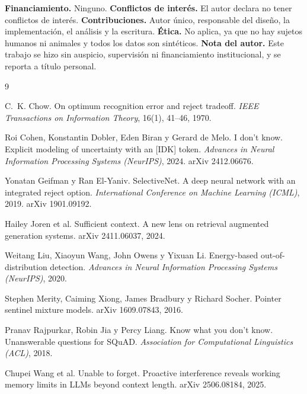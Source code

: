 \documentclass[11pt,a4paper]{article}
\begin{document}
\textbf{Financiamiento.} Ninguno. \textbf{Conflictos de interés.} El autor declara no tener
conflictos de interés. \textbf{Contribuciones.} Autor único, responsable del diseño, la
implementación, el análisis y la escritura. \textbf{Ética.} No aplica, ya que no hay sujetos humanos
ni animales y todos los datos son sintéticos. \textbf{Nota del autor.} Este trabajo se hizo sin
auspicio, supervisión ni financiamiento institucional, y se reporta a título personal.

\begin{thebibliography}{9}

C.~K. Chow.
\newblock On optimum recognition error and reject tradeoff.
\newblock \emph{IEEE Transactions on Information Theory}, 16(1), 41--46, 1970.

Roi Cohen, Konstantin Dobler, Eden Biran y Gerard de Melo.
\newblock I don't know. Explicit modeling of uncertainty with an [IDK] token.
\newblock \emph{Advances in Neural Information Processing Systems (NeurIPS)}, 2024.
\newblock arXiv 2412.06676.

Yonatan Geifman y Ran El-Yaniv.
\newblock SelectiveNet. A deep neural network with an integrated reject option.
\newblock \emph{International Conference on Machine Learning (ICML)}, 2019.
\newblock arXiv 1901.09192.

Hailey Joren et al.
\newblock Sufficient context. A new lens on retrieval augmented generation systems.
\newblock arXiv 2411.06037, 2024.

Weitang Liu, Xiaoyun Wang, John Owens y Yixuan Li.
\newblock Energy-based out-of-distribution detection.
\newblock \emph{Advances in Neural Information Processing Systems (NeurIPS)}, 2020.

Stephen Merity, Caiming Xiong, James Bradbury y Richard Socher.
\newblock Pointer sentinel mixture models.
\newblock arXiv 1609.07843, 2016.

Pranav Rajpurkar, Robin Jia y Percy Liang.
\newblock Know what you don't know. Unanswerable questions for SQuAD.
\newblock \emph{Association for Computational Linguistics (ACL)}, 2018.

Chupei Wang et al.
\newblock Unable to forget. Proactive interference reveals working memory limits in LLMs beyond
context length.
\newblock arXiv 2506.08184, 2025.

\end{thebibliography}
\end{document}
